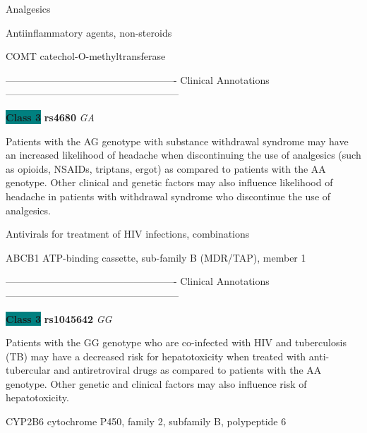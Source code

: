 \documentclass{resume} %
\begin{document}
\begin{rSection}{ Analgesics }
\end{rSection}\begin{rSection}{ Antiinflammatory agents, non-steroids }
\item[]

\begin{rSubsection}{ COMT }{ catechol-O-methyltransferase }{}{}
\item[]

\item[] ---------------------------------------------------- Clinical Annotations -----------------------------------------------------\newline
\item \textbf{\colorbox{teal} {Class 3}} \textbf{ rs4680 } \textit{ GA }
\item[] Patients with the AG genotype with substance withdrawal syndrome may have an increased likelihood of headache when discontinuing the use of analgesics (such as opioids, NSAIDs, triptans, ergot) as compared to patients with the AA genotype. Other clinical and genetic factors may also influence likelihood of headache in patients with withdrawal syndrome who discontinue the use of analgesics.
\end{rSubsection}

\end{rSection}\begin{rSection}{ Antivirals for treatment of HIV infections, combinations }
\item[]

\begin{rSubsection}{ ABCB1 }{ ATP-binding cassette, sub-family B (MDR/TAP), member 1 }{}{}
\item[]

\item[] ---------------------------------------------------- Clinical Annotations -----------------------------------------------------\newline
\item \textbf{\colorbox{teal} {Class 3}} \textbf{ rs1045642 } \textit{ GG }
\item[] Patients with the GG genotype who are co-infected with HIV and tuberculosis (TB) may have a decreased risk for hepatotoxicity when treated with anti-tubercular and antiretroviral drugs as compared to patients with the AA genotype. Other genetic and clinical factors may also influence risk of hepatotoxicity.
\end{rSubsection}\begin{rSubsection}{ CYP2B6 }{ cytochrome P450, family 2, subfamily B, polypeptide 6 }{}{}
\item[]


\end{rSubsection}
\end{rSection}
\end{document}
